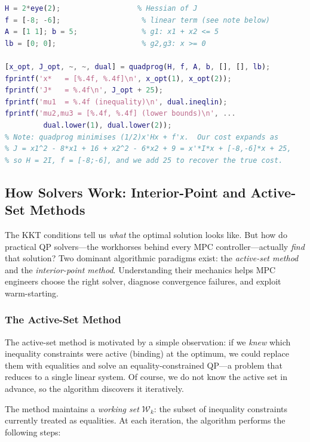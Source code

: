 \begin{lstlisting}[language=Matlab,caption={Solving the KKT example with \texttt{quadprog}.}]
H = 2*eye(2);                  % Hessian of J
f = [-8; -6];                   % linear term (see note below)
A = [1 1]; b = 5;               % g1: x1 + x2 <= 5
lb = [0; 0];                    % g2,g3: x >= 0

[x_opt, J_opt, ~, ~, dual] = quadprog(H, f, A, b, [], [], lb);
fprintf('x*   = [%.4f, %.4f]\n', x_opt(1), x_opt(2));
fprintf('J*   = %.4f\n', J_opt + 25);
fprintf('mu1  = %.4f (inequality)\n', dual.ineqlin);
fprintf('mu2,mu3 = [%.4f, %.4f] (lower bounds)\n', ...
         dual.lower(1), dual.lower(2));
% Note: quadprog minimises (1/2)x'Hx + f'x.  Our cost expands as
% J = x1^2 - 8*x1 + 16 + x2^2 - 6*x2 + 9 = x'*I*x + [-8,-6]*x + 25,
% so H = 2I, f = [-8;-6], and we add 25 to recover the true cost.
\end{lstlisting}

\subsection{How Solvers Work: Interior-Point and Active-Set Methods}

The KKT conditions tell us \emph{what} the optimal solution looks like. But how do practical QP solvers---the workhorses behind every MPC controller---actually \emph{find} that solution? Two dominant algorithmic paradigms exist: the \emph{active-set method} and the \emph{interior-point method}. Understanding their mechanics helps MPC engineers choose the right solver, diagnose convergence failures, and exploit warm-starting.

\subsubsection{The Active-Set Method}

The active-set method is motivated by a simple observation: if we \emph{knew} which inequality constraints were active (binding) at the optimum, we could replace them with equalities and solve an equality-constrained QP---a problem that reduces to a single linear system. Of course, we do not know the active set in advance, so the algorithm discovers it iteratively.

The method maintains a \emph{working set} $\mathcal{W}_k$: the subset of inequality constraints currently treated as equalities. At each iteration, the algorithm performs the following steps:

